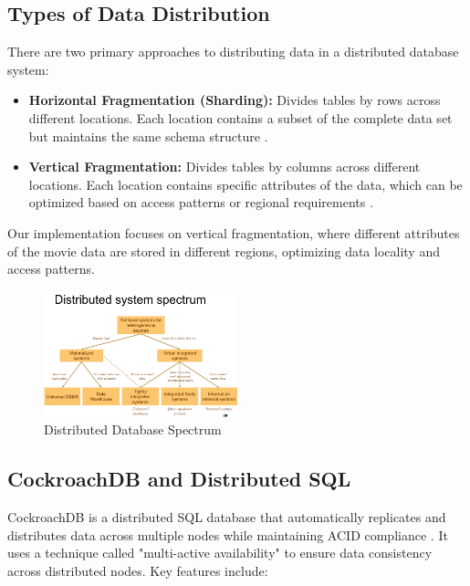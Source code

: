 \documentclass[twoside]{article}
\begin{document}
\subsection{Types of Data Distribution}

There are two primary approaches to distributing data in a distributed database system:

\begin{itemize}
  \item \textbf{Horizontal Fragmentation (Sharding):} Divides tables by rows across different locations. Each location contains a subset of the complete data set but maintains the same schema structure \cite{mongodb}.
  
  \item \textbf{Vertical Fragmentation:} Divides tables by columns across different locations. Each location contains specific attributes of the data, which can be optimized based on access patterns or regional requirements \cite{cockroachlabs}.
\end{itemize}

Our implementation focuses on vertical fragmentation, where different attributes of the movie data are stored in different regions, optimizing data locality and access patterns.

\begin{figure}[H]
  \centering
  \includegraphics[width=0.5\textwidth]{imgs/distribuitedspectrum.png}
  \caption{Distributed Database Spectrum}
  \label{fig:1}
\end{figure}

\subsection{CockroachDB and Distributed SQL}

CockroachDB is a distributed SQL database that automatically replicates and distributes data across multiple nodes while maintaining ACID compliance \cite{cockroachlabs}. It uses a technique called "multi-active availability" to ensure data consistency across distributed nodes. Key features include:
\end{document}
